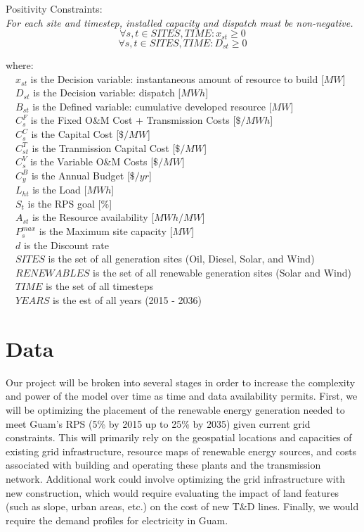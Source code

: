 \documentclass[12pt,letterpaper,fleqn]{report}
\begin{document}
  Positivity Constraints:\\
  \emph{For each site and timestep, installed capacity and dispatch
    must be non-negative.}
  \[\forall s,t \in SITES, TIME: x_{st} \ge 0\]
  \[\forall s,t \in SITES, TIME: D_{st} \ge 0\]
  
  where:\\
  {\setlength{\parindent}{-1em}
    $\quad x_{st}^{}$ is the Decision variable: instantaneous amount of resource to build [$MW$]\\
    $\quad D_{st}^{}$ is the Decision variable: dispatch [$MWh$]\\
    $\quad B_{st}^{}$ is the Defined variable: cumulative developed resource [$MW$]\\
    $\quad C_{s}^{F}$ is the Fixed O\&M Cost + Transmission Costs [$\$/MWh$]\\
    $\quad C_{s}^{C}$ is the Capital Cost [$\$/MW$]\\
    $\quad C_{st}^{T}$ is the Tranmission Capital Cost [$\$/MW$]\\
    $\quad C_{s}^{V}$ is the Variable O\&M Costs [$\$/MW$]\\
    $\quad C_{y}^{B}$ is the Annual Budget [$\$/yr$]\\
    $\quad L_{ht}^{}$ is the Load [$MWh$]\\
    $\quad S_{t}^{}$ is the RPS goal [$\%$]\\
    $\quad A_{st}^{}$ is the Resource availability [$MWh/MW$]\\
    $\quad P_{s}^{max}$ is the Maximum site capacity [$MW$]\\
    $\quad d$ is the Discount rate\\
    $\quad SITES$ is the set of all generation sites (Oil, Diesel,
    Solar, and Wind)\\
    $\quad RENEWABLES$ is the set of all renewable generation sites
    (Solar and Wind)\\
    $\quad TIME$ is the set of all timesteps\\
    $\quad YEARS$ is the est of all years (2015 - 2036)
  }



\section{Data}

Our project will be broken into several stages in order to increase
the complexity and power of the model over time as time and data
availability permits. First, we will be optimizing the placement of
the renewable energy generation needed to meet Guam's RPS (5\% by 2015
up to 25\% by 2035) given current grid constraints. This will
primarily rely on the geospatial locations and capacities of existing
grid infrastructure, resource maps of renewable energy sources, and
costs associated with building and operating these plants and the
transmission network. Additional work could involve optimizing the
grid infrastructure with new construction, which would require
evaluating the impact of land features (such as slope, urban areas,
etc.) on the cost of new T\&D lines. Finally, we would require the
demand profiles for electricity in Guam.
\end{document}
